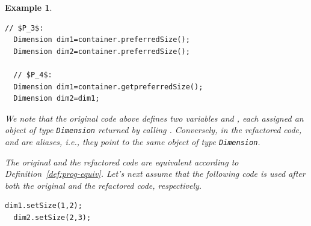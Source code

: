 \documentclass[sigconf]{acmart}
\newtheorem{example}{Example}
\begin{document}
\begin{example}\label{ex:aliasing}
~\begin{lstlisting}[mathescape=true,showstringspaces=false,numbers=none]
  // $P_3$:
  Dimension dim1=container.preferredSize();
  Dimension dim2=container.preferredSize();

  // $P_4$:
  Dimension dim1=container.getpreferredSize();
  Dimension dim2=dim1;
\end{lstlisting}








We note that the original code above defines two variables  and
, each assigned an object of type \lstinline[breaklines=true]{Dimension} returned by calling
.
Conversely, in the refactored code,  and  are aliases,
i.e., they point to the same
object of type \lstinline[breaklines=true]{Dimension}.

The original and the refactored code are equivalent according to Definition~\ref{def:prog-equiv}.
Let's next assume that the following code
is used after both the original and the refactored code, respectively.

\begin{lstlisting}[mathescape=true,showstringspaces=false]
  dim1.setSize(1,2);
  dim2.setSize(2,3);
\end{lstlisting}


\end{example}
\end{document}
